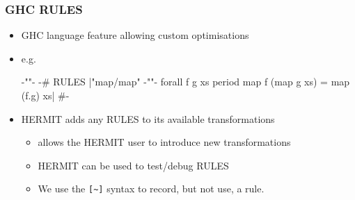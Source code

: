 \begin{frame}[verbatim]
\frametitle{GHC RULES}

\begin{itemize}
\item GHC language feature allowing custom optimisations
\item e.g.
{%
{\color{haskell:comment}
\begin{code}
{-"\hspace{-10ex}"-} {-# RULES |"map/map" {-"{\color{black}\;"-} forall f g xs period  map f (map g xs) = map (f.g) xs|} #-}
\end{code}
}
}
\vspace{-3ex}
\item HERMIT adds any RULES to its available transformations
            \begin{itemize}
               \item allows the HERMIT user to introduce new transformations
               \item HERMIT can be used to test/debug RULES
               \item We use the \verb|[~]| syntax to record, but not use, a rule.
            \end{itemize}

\end{itemize}


\end{frame}
